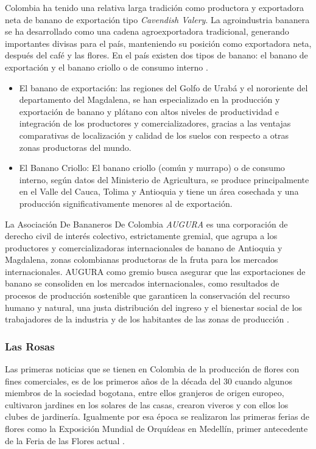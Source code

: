 Colombia ha tenido una relativa larga tradición como productora y exportadora neta de banano de exportación tipo \emph{Cavendish Valery}. La agroindustria bananera se ha desarrollado como una cadena agroexportadora tradicional, generando importantes divisas para el país, manteniendo su posición como exportadora neta, después del café y las flores. En el país existen dos tipos de banano: el banano de exportación y el banano criollo o de consumo interno \cite{bananoFINAGRO}.

\begin{itemize}
\item El banano de exportación: las regiones del Golfo de Urabá y el nororiente del departamento del Magdalena, se han especializado en la producción y exportación de banano y plátano con altos niveles de productividad e integración de los productores y comercializadores, gracias a las ventajas comparativas de localización y calidad de los suelos con respecto a otras zonas productoras del mundo.
\item El Banano Criollo: El banano criollo (común y murrapo) o de consumo interno, según datos del Ministerio de Agricultura, se produce principalmente en el Valle del Cauca, Tolima y Antioquia y tiene un área cosechada y una producción significativamente menores al de exportación.
\end{itemize}

La Asociación De Bananeros De Colombia \emph{AUGURA} es una corporación de derecho civil de interés colectivo, estrictamente gremial, que agrupa a los productores y comercializadoras internacionales de banano de Antioquia y Magdalena, zonas colombianas productoras de la fruta para los mercados internacionales. AUGURA como gremio busca asegurar que las exportaciones de banano se consoliden en los mercados internacionales, como resultados de procesos de producción sostenible que garanticen la conservación del recurso humano y natural, una justa distribución del ingreso y el bienestar social de los trabajadores de la industria y de los habitantes de las zonas de producción \cite{bananoAUGURA}.

\subsubsection{Las Rosas}
Las primeras noticias que se tienen en Colombia de la producción de flores con  fines comerciales, es de los primeros años de la década del 30 cuando algunos miembros de la sociedad bogotana, entre ellos granjeros de origen europeo, cultivaron jardines en los solares de las casas, crearon viveros y con ellos  los clubes de jardinería. Igualmente por esa época se realizaron las primeras  ferias de flores como la Exposición Mundial de Orquídeas en Medellín, primer antecedente de la Feria de las Flores actual \cite{cardenasRodriguez}.

